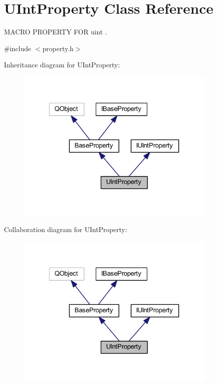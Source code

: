 \hypertarget{class_u_int_property}{\section{U\-Int\-Property Class Reference}
\label{class_u_int_property}
}


M\-A\-C\-R\-O P\-R\-O\-P\-E\-R\-T\-Y F\-O\-R uint .  




{\ttfamily \#include $<$property.\-h$>$}



Inheritance diagram for U\-Int\-Property\-:
\nopagebreak
\begin{figure}[H]
\begin{center}
\leavevmode
\includegraphics[width=277pt]{class_u_int_property__inherit__graph}
\end{center}
\end{figure}


Collaboration diagram for U\-Int\-Property\-:
\nopagebreak
\begin{figure}[H]
\begin{center}
\leavevmode
\includegraphics[width=277pt]{class_u_int_property__coll__graph}
\end{center}
\end{figure}
